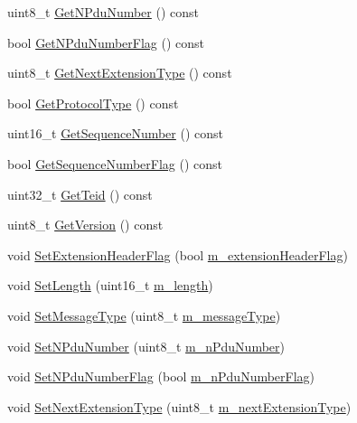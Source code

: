 \begin{DoxyCompactItemize}
\item 
uint8\+\_\+t \hyperlink{classns3_1_1GtpuHeader_a7b0c95e609559f62f20fa41b76733c5a}{Get\+N\+Pdu\+Number} () const 
\item 
bool \hyperlink{classns3_1_1GtpuHeader_a1e33c9f19d344f4f1d9eb3b8d08d080a}{Get\+N\+Pdu\+Number\+Flag} () const 
\item 
uint8\+\_\+t \hyperlink{classns3_1_1GtpuHeader_a86517fc3452af48b8e0c7aa20f357854}{Get\+Next\+Extension\+Type} () const 
\item 
bool \hyperlink{classns3_1_1GtpuHeader_a69be3af86f89e7d7265309b4f7a08254}{Get\+Protocol\+Type} () const 
\item 
uint16\+\_\+t \hyperlink{classns3_1_1GtpuHeader_a43f1ff9d61b838e501a8ce739b880c00}{Get\+Sequence\+Number} () const 
\item 
bool \hyperlink{classns3_1_1GtpuHeader_a9b7d6a3d3b228a65cc91ec4e49fe94d3}{Get\+Sequence\+Number\+Flag} () const 
\item 
uint32\+\_\+t \hyperlink{classns3_1_1GtpuHeader_aafae2ffb2a17c4fab1245e66a6bd814c}{Get\+Teid} () const 
\item 
uint8\+\_\+t \hyperlink{classns3_1_1GtpuHeader_a049e29769bb59148afe551269d3d3d84}{Get\+Version} () const 
\item 
void \hyperlink{classns3_1_1GtpuHeader_a346f3e19635a964c2baaf52f3e76ec81}{Set\+Extension\+Header\+Flag} (bool \hyperlink{classns3_1_1GtpuHeader_a30bd9a75b36836bf46574001327e9e20}{m\+\_\+extension\+Header\+Flag})
\item 
void \hyperlink{classns3_1_1GtpuHeader_abad61a7670462a12486774e05d39eb0e}{Set\+Length} (uint16\+\_\+t \hyperlink{classns3_1_1GtpuHeader_ab6f0dc585ae24ecbdc8dc8fb12bcf54f}{m\+\_\+length})
\item 
void \hyperlink{classns3_1_1GtpuHeader_ae4576011cbcae77d24bd5b94fc0cee2e}{Set\+Message\+Type} (uint8\+\_\+t \hyperlink{classns3_1_1GtpuHeader_a5295b542b750d59ed3dd62cfa33e1413}{m\+\_\+message\+Type})
\item 
void \hyperlink{classns3_1_1GtpuHeader_afaeca3a37bc2c8a2014223ff66674320}{Set\+N\+Pdu\+Number} (uint8\+\_\+t \hyperlink{classns3_1_1GtpuHeader_a807ca692a4cfc9124abf02544f3d096a}{m\+\_\+n\+Pdu\+Number})
\item 
void \hyperlink{classns3_1_1GtpuHeader_af325ff08c6a9690dba518efe0dea1647}{Set\+N\+Pdu\+Number\+Flag} (bool \hyperlink{classns3_1_1GtpuHeader_a2b5367fdc1e0be87bcd9b9911853a64e}{m\+\_\+n\+Pdu\+Number\+Flag})
\item 
void \hyperlink{classns3_1_1GtpuHeader_ab2a334fd893925ad78b2684085382bae}{Set\+Next\+Extension\+Type} (uint8\+\_\+t \hyperlink{classns3_1_1GtpuHeader_a0fd669943a74011403a8be717e7f41c0}{m\+\_\+next\+Extension\+Type})

\end{DoxyCompactItemize}
